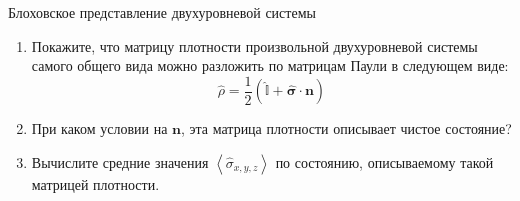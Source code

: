\begin{problem}{Блоховское представление двухуровневой системы}
	\begin{enumerate}
		\item 
		Покажите, что матрицу плотности произвольной двухуровневой системы самого общего вида можно разложить по
		матрицам Паули в следующем виде:
		$$
		\hat{\rho}=\frac{1}{2}(\hat{\mathbb{I}}+\hat{\boldsymbol{\sigma}} \cdot \boldsymbol{n})
		$$
		
		\item 
		При каком условии на $ \boldsymbol{n} $, эта матрица плотности описывает чистое состояние?
		
		\item 
		Вычислите средние значения $\left\langle\hat{\sigma}_{x, y, z}\right\rangle$  по состоянию, описываемому такой матрицей плотности.
	\end{enumerate}
\end{problem}

